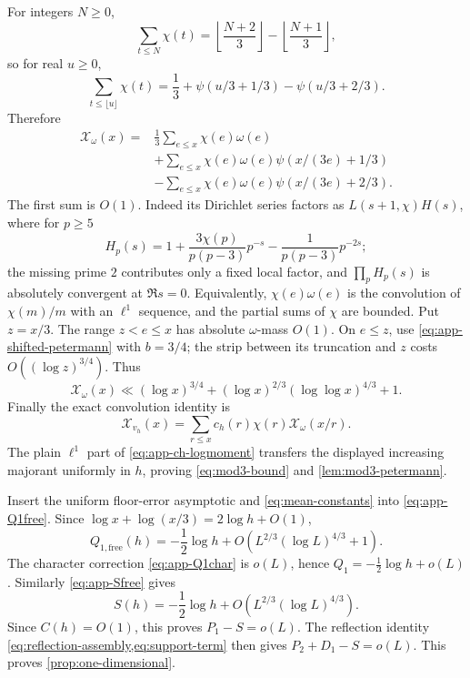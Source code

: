\documentclass[11pt]{article}
\theoremstyle{definition}
\theoremstyle{remark}
\newcommand{\Xcal}{\mathcal X}
\newcommand{\1}{\mathbf 1}
\newcommand{\om}{\omega}
\newcommand{\free}{\mathrm{free}}
\begin{document}
For integers $N\ge0$,
\[
\sum_{t\le N}\chi(t)
=\left\lfloor\frac{N+2}{3}\right\rfloor
 -\left\lfloor\frac{N+1}{3}\right\rfloor,
\]
so for real $u\ge0$,
\[
\sum_{t\le\lfloor u\rfloor}\chi(t)
=\frac13+\psi(u/3+1/3)-\psi(u/3+2/3).
\]
Therefore
\begin{align*}
\Xcal_\om(x)
={}&\frac13\sum_{e\le x}\chi(e)\om(e)\\
&+\sum_{e\le x}\chi(e)\om(e)\psi(x/(3e)+1/3)\\
&-\sum_{e\le x}\chi(e)\om(e)\psi(x/(3e)+2/3).
\end{align*}
The first sum is $O(1)$.  Indeed its Dirichlet series factors as
$L(s+1,\chi)H(s)$, where for $p\ge5$
\[
H_p(s)=1+\frac{3\chi(p)}{p(p-3)}p^{-s}
       -\frac1{p(p-3)}p^{-2s};
\]
the missing prime $2$ contributes only a fixed local factor, and
$\prod_pH_p(s)$ is absolutely convergent at $\Re s=0$.  Equivalently,
$\chi(e)\om(e)$ is the convolution of $\chi(m)/m$ with an $\ell^1$ sequence,
and the partial sums of $\chi$ are bounded.  Put $z=x/3$.  The range
$z<e\le x$ has absolute $\om$-mass $O(1)$.  On $e\le z$, use
\cref{eq:app-shifted-petermann} with $b=3/4$; the strip between its truncation
and $z$ costs $O((\log z)^{3/4})$.  Thus
\[
\Xcal_\om(x)
\ll(\log x)^{3/4}
 +(\log x)^{2/3}(\log\log x)^{4/3}+1.
\]
Finally the exact convolution identity is
\[
\Xcal_{v_h}(x)=\sum_{r\le x}c_h(r)\chi(r)\Xcal_\om(x/r).
\]
The plain $\ell^1$ part of \cref{eq:app-ch-logmoment} transfers the displayed increasing majorant uniformly in $h$, proving \cref{eq:mod3-bound} and \cref{lem:mod3-petermann}.

Insert the uniform floor-error asymptotic and \cref{eq:mean-constants} into \cref{eq:app-Q1free}.  Since
$\log x+\log(x/3)=2\log h+O(1)$,
\[
Q_{1,\free}(h)
=-\frac12\log h+O(L^{2/3}(\log L)^{4/3}+1).
\]
The character correction \cref{eq:app-Q1char} is $o(L)$, hence
$Q_1=-\tfrac12\log h+o(L)$.  Similarly \cref{eq:app-Sfree} gives
\[
S(h)=-\frac12\log h+O(L^{2/3}(\log L)^{4/3}).
\]
Since $C(h)=O(1)$, this proves $P_1-S=o(L)$.  The reflection identity
\cref{eq:reflection-assembly,eq:support-term} then gives
$P_2+D_1-S=o(L)$.  This proves \cref{prop:one-dimensional}.
\end{document}
